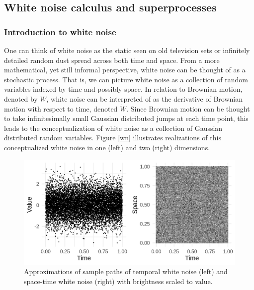 \documentclass[]{article}
\begin{document}
\hypertarget{white-noise-calculus-and-superprocesses}{%
\subsection{\texorpdfstring{White noise calculus and superprocesses
\label{wnc}}{White noise calculus and superprocesses }}\label{white-noise-calculus-and-superprocesses}}

\hypertarget{introduction-to-white-noise}{%
\subsubsection{Introduction to white
noise}\label{introduction-to-white-noise}}

One can think of white noise as the static seen on old television sets
or infinitely detailed random dust spread across both time and space.
From a more mathematical, yet still informal perspective, white noise
can be thought of as a stochastic process. That is, we can picture white
noise as a collection of random variables indexed by time and possibly
space. In relation to Brownian motion, denoted by \(W\), white noise can
be interpreted of as the derivative of Brownian motion with respect to
time, denoted \(\dot W\). Since Brownian motion can be thought to take
infinitesimally small Gaussian distributed jumps at each time point,
this leads to the conceptualization of white noise as a collection of
Gaussian distributed random variables. Figure \ref{wn} illustrates
realizations of this conceptualized white noise in one (left) and two
(right) dimensions.

\begin{figure}

{\centering \includegraphics{wn} 

}

\caption{\label{wn}Approximations of sample paths of temporal white noise (left) and space-time white noise (right) with brightness scaled to value.}\label{fig:unnamed-chunk-2}
\end{figure}
\end{document}
